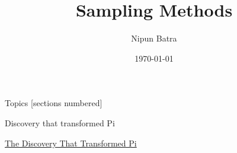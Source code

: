 \documentclass{beamer}
\begin{document}
\title{Sampling Methods}
\author{Nipun Batra}
\date{\today}
\maketitle

\begin{frame}{Topics}
    [sections numbered]
    \tableofcontents[hideallsubsections]

\end{frame}

\begin{section}{Discovery that transformed Pi}
    \begin{frame}
        \href{https://www.youtube.com/watch?v=gMlf1ELvRzc}{The Discovery That Transformed Pi}
    \end{frame}
\end{section}
\end{document}
